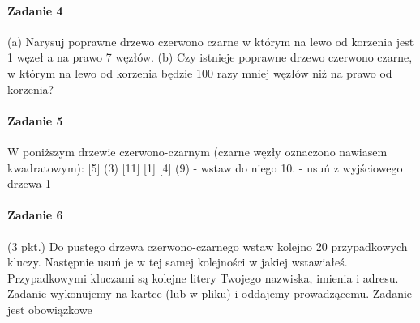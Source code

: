 \documentclass[18pt]{extarticle}
\begin{document}
\paragraph{Zadanie 4} (a) Narysuj poprawne drzewo czerwono czarne w którym na lewo od korzenia jest 1 węzeł a na prawo 7 węzłów.
(b) Czy istnieje poprawne drzewo czerwono czarne, w którym na lewo od korzenia będzie 100 razy mniej węzłów niż na prawo od korzenia?

\paragraph{Zadanie 5} W poniższym drzewie czerwono-czarnym (czarne węzły oznaczono nawiasem kwadratowym):
[5]
(3) [11]
[1] [4] (9)
- wstaw do niego 10.
- usuń z wyjściowego drzewa 1

\pagebreak
\paragraph{Zadanie 6} (3 pkt.) Do pustego drzewa czerwono-czarnego wstaw kolejno 20 przypadkowych kluczy. Następnie usuń je w tej samej kolejności w jakiej wstawiałeś. Przypadkowymi kluczami są kolejne litery Twojego nazwiska, imienia i adresu. Zadanie wykonujemy na kartce (lub w pliku) i oddajemy prowadzącemu. Zadanie jest obowiązkowe
\end{document}
